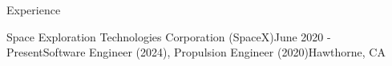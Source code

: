 \documentclass{resume} %
\begin{document}
\begin{rSection}{Experience}
\begin{rSubsection}{{Space Exploration Technologies Corporation (SpaceX)}}{June 2020 - Present}{Software Engineer (2024), Propulsion Engineer (2020)}{Hawthorne, CA}

\end{rSubsection}
\end{rSection}
\end{document}
